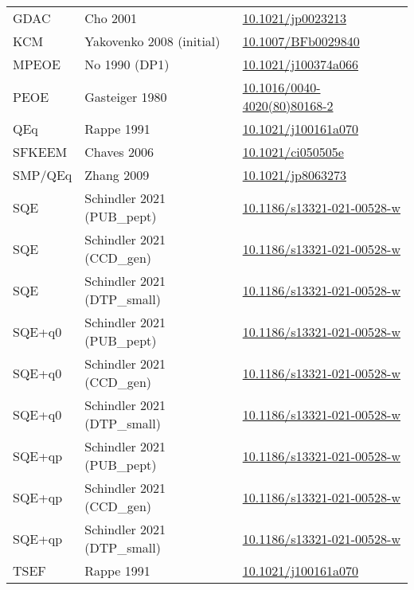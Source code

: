 \documentclass[oneside]{memoir}
\begin{document}
\begin{table}
\begin{tabular}{lll}
GDAC & Cho 2001 & \href{https://doi.org/10.1021/jp0023213}{10.1021/jp0023213}\\
KCM & Yakovenko 2008 (initial) & \href{https://doi.org/10.1007/BFb0029840}{10.1007/BFb0029840}\\
MPEOE & No 1990 (DP1) & \href{https://doi.org/10.1021/j100374a066}{10.1021/j100374a066}\\
PEOE & Gasteiger 1980 & \href{https://doi.org/10.1016/0040-4020(80)80168-2}{10.1016/0040-4020(80)80168-2}\\
QEq & Rappe 1991 & \href{https://doi.org/10.1021/j100161a070}{10.1021/j100161a070}\\
SFKEEM & Chaves 2006 & \href{https://doi.org/10.1021/ci050505e}{10.1021/ci050505e}\\
SMP/QEq & Zhang 2009 & \href{https://doi.org/10.1021/jp8063273}{10.1021/jp8063273}\\
SQE & Schindler 2021 (PUB\_pept) & \href{https://doi.org/10.1186/s13321-021-00528-w}{10.1186/s13321-021-00528-w}\\
SQE & Schindler 2021 (CCD\_gen) & \href{https://doi.org/10.1186/s13321-021-00528-w}{10.1186/s13321-021-00528-w}\\
SQE & Schindler 2021 (DTP\_small) & \href{https://doi.org/10.1186/s13321-021-00528-w}{10.1186/s13321-021-00528-w}\\
SQE+q0 & Schindler 2021 (PUB\_pept) & \href{https://doi.org/10.1186/s13321-021-00528-w}{10.1186/s13321-021-00528-w}\\
SQE+q0 & Schindler 2021 (CCD\_gen) & \href{https://doi.org/10.1186/s13321-021-00528-w}{10.1186/s13321-021-00528-w}\\
SQE+q0 & Schindler 2021 (DTP\_small) & \href{https://doi.org/10.1186/s13321-021-00528-w}{10.1186/s13321-021-00528-w}\\
SQE+qp & Schindler 2021 (PUB\_pept) & \href{https://doi.org/10.1186/s13321-021-00528-w}{10.1186/s13321-021-00528-w}\\
SQE+qp & Schindler 2021 (CCD\_gen) & \href{https://doi.org/10.1186/s13321-021-00528-w}{10.1186/s13321-021-00528-w}\\
SQE+qp & Schindler 2021 (DTP\_small) & \href{https://doi.org/10.1186/s13321-021-00528-w}{10.1186/s13321-021-00528-w}\\
TSEF & Rappe 1991 & \href{https://doi.org/10.1021/j100161a070}{10.1021/j100161a070}\\
\bottomrule
\end{tabular}
\end{table}
\end{document}
